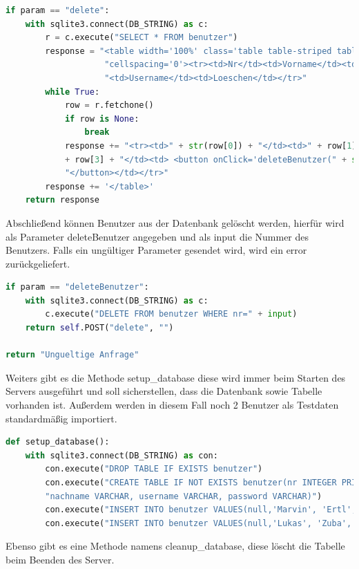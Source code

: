 \begin{lstlisting}[language=Python, caption=Auslesen aller Benutzer mit einen Löschen Button]
if param == "delete":
	with sqlite3.connect(DB_STRING) as c:
		r = c.execute("SELECT * FROM benutzer")
		response = "<table width='100%' class='table table-striped table-bordered'" \
					"cellspacing='0'><tr><td>Nr</td><td>Vorname</td><td>Nachname</td>" \
					"<td>Username</td><td>Loeschen</td></tr>"
		while True:
			row = r.fetchone()
			if row is None:
				break
			response += "<tr><td>" + str(row[0]) + "</td><td>" + row[1] + "</td><td>" + row[2] + "</td><td>" \
			+ row[3] + "</td><td> <button onClick='deleteBenutzer(" + str(row[0]) + ")'>Loeschen" \
			"</button></td></tr>"
		response += '</table>'
	return response
\end{lstlisting}	

Abschließend können Benutzer aus der Datenbank gelöscht werden, hierfür wird als Parameter deleteBenutzer angegeben und als input die Nummer des Benutzers. Falls ein ungültiger Parameter gesendet wird, wird ein error zurückgeliefert.

\begin{lstlisting}[language=Python, caption=Löschen eines bestimmten Benutzers]
if param == "deleteBenutzer":
	with sqlite3.connect(DB_STRING) as c:
		c.execute("DELETE FROM benutzer WHERE nr=" + input)
	return self.POST("delete", "")

return "Ungueltige Anfrage"
\end{lstlisting}

Weiters gibt es die Methode setup\_database diese wird immer beim Starten des Servers ausgeführt und soll sicherstellen, dass die Datenbank sowie Tabelle vorhanden ist. Außerdem werden in diesem Fall noch 2 Benutzer als Testdaten standardmäßig importiert.

\begin{lstlisting}[language=Python, caption=Erstellen der Tabelle Benutzer beim Start des Servers]
def setup_database():
	with sqlite3.connect(DB_STRING) as con:
		con.execute("DROP TABLE IF EXISTS benutzer")
		con.execute("CREATE TABLE IF NOT EXISTS benutzer(nr INTEGER PRIMARY KEY AUTOINCREMENT, vorname VARCHAR, "
		"nachname VARCHAR, username VARCHAR, password VARCHAR)")
		con.execute("INSERT INTO benutzer VALUES(null,'Marvin', 'Ertl', 'mertl', 'password')")
		con.execute("INSERT INTO benutzer VALUES(null,'Lukas', 'Zuba', 'lzuba', 'password')")
\end{lstlisting}

Ebenso gibt es eine Methode namens cleanup\_database, diese löscht die Tabelle beim Beenden des Server.

